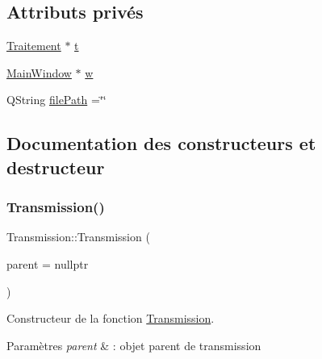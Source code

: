 \subsection*{Attributs privés}
\begin{DoxyCompactItemize}
\item 
\hyperlink{classTraitement}{Traitement} $\ast$ \hyperlink{classTransmission_ad05ceda47dcb0763e32e03e089defdb0}{t}
\item 
\hyperlink{classMainWindow}{Main\+Window} $\ast$ \hyperlink{classTransmission_a46ff40b83d046581408dce2027139fe0}{w}
\item 
Q\+String \hyperlink{classTransmission_a3514cc6116b900b586f8cbf194cb39e7}{file\+Path} =\char`\"{}\char`\"{}
\end{DoxyCompactItemize}


\subsection{Documentation des constructeurs et destructeur}
\mbox{\label{classTransmission_a1d8087d2d09b9ddd4fd6e8261daed9f3}} 
\subsubsection{\texorpdfstring{Transmission()}{Transmission()}}
{\footnotesize\ttfamily Transmission\+::\+Transmission (\begin{DoxyParamCaption}\item[{Q\+Object $\ast$}]{parent = {\ttfamily nullptr} }\end{DoxyParamCaption})\hspace{0.3cm}{\ttfamily [explicit]}}



Constructeur de la fonction \hyperlink{classTransmission}{Transmission}. 


\begin{DoxyParams}{Paramètres}
{\em parent} & \+: objet parent de transmission \\
\hline
\end{DoxyParams}
\mbox{\label{classTransmission_adcdc6012d99ddb1d0c3159d50984e146}} 

